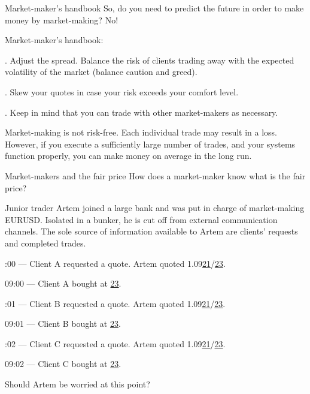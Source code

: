 \documentclass{beamer}
\begin{document}
\begin{frame}{Market-maker's handbook}
\justify
So, do you need to predict the future in order to make money by market-making? No!

\justify
Market-maker's handbook:

. Adjust the spread. Balance the risk of clients trading away with the expected volatility of the market (balance caution and greed).

. Skew your quotes in case your risk exceeds your comfort level.

. Keep in mind that you can trade with other market-makers as necessary.

\justify
Market-making is not risk-free. Each individual trade may result in a loss. However, if you execute a sufficiently large number of trades, and your systems function properly, you can make money on average in the long run.
\end{frame}



\begin{frame}{Market-makers and the fair price}
\justify
How does a market-maker know what is the \alert{fair} price?

\justify
Junior trader Artem joined a large bank and was put in charge of market-making EURUSD. Isolated in a bunker, he is cut off from external communication channels. The sole source of information available to Artem are clients' requests and completed trades.

:00 --- Client A requested a quote. Artem quoted 1.09\underline{21}/\underline{23}.

09:00 --- Client A bought at \underline{23}.

:01 --- Client B requested a quote. Artem quoted 1.09\underline{21}/\underline{23}.

09:01 --- Client B bought at \underline{23}.

:02 --- Client C requested a quote. Artem quoted 1.09\underline{21}/\underline{23}.

09:02 --- Client C bought at \underline{23}.

\justify
Should Artem be worried at this point?
\end{frame}
\end{document}
